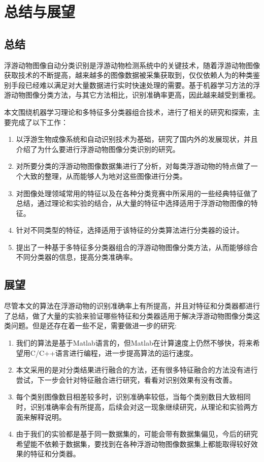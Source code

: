 \chapter{总结与展望}

\section{总结}

浮游动物图像自动分类识别是浮游动物检测系统中的关键技术，随着浮游动物图像获取技术的不断提高，越来越多的图像数据被采集获取到，仅仅依赖人为的种类鉴别手段已经难以满足对大量数据进行实时快速处理的需要。基于机器学习方法的浮游动物图像分类方法，与其它方法相比，识别准确率更高，因此越来越受到重视。

本文围绕机器学习理论和多特征多分类器组合技术，进行了相关的研究和探索，主要完成了以下工作：

\begin{enumerate}
\item 以浮游生物成像系统和自动识别技术为基础，研究了国内外的发展现状，并且介绍了为什么要进行浮游动物图像分类识别的研究。
\item 对所要分类的浮游动物图像数据集进行了分析，对每类浮游动物的特点做了一个大致的整理，从而能够人为地对这些图像进行分类。
\item 对图像处理领域常用的特征以及在各种分类竞赛中所采用的一些经典特征做了总结，通过理论和实验的结合，从大量的特征中选择适用于浮游动物图像的特征。
\item 针对不同类型的特征，选择适用于该特征的分类算法进行分类器的设计。
\item 提出了一种基于多特征多分类器组合的浮游动物图像分类方法，从而能够综合不同分类器的信息，提高分类准确率。
\end{enumerate}

\section{展望}

尽管本文的算法在浮游动物的识别准确率上有所提高，并且对特征和分类器都进行了总结，做了大量的实验来验证哪些特征和分类器适用于解决浮游动物图像分类这类问题。但是还存在着一些不足，需要做进一步的研究:

\begin{enumerate}
\item 我们的算法是基于Matlab语言的，但Matlab在计算速度上仍然不够快，将来希望用C/C++语言进行编程，进一步提高算法的运行速度。
\item 本文采用的是对分类结果进行融合的方法，还有很多特征融合的方法没有进行尝试，下一步会针对特征融合进行研究，看看对识别效果有没有改善。
\item 每个类别图像数目相差较多时，识别准确率较低，当每个类别数目大致相同时，识别准确率会有所提高，后续会对这一现象继续研究，从理论和实验两方面来解释说明。
\item 由于我们的实验都是基于同一数据集的，可能会带有数据集偏见，今后的研究希望能不依赖于数据集，要找到在各种浮游动物图像数据集上都能取得较好效果的特征和分类器。
\end{enumerate}